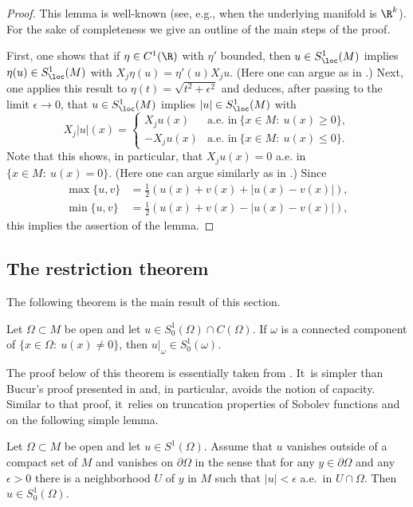 \begin{proof}
This lemma is well-known (see, e.g., \cite[Lem.\,3.5]{GaNh} when the underlying manifold is $\R^k$). For the sake of completeness we give an outline of the main steps of the proof.

First, one shows that if $\eta\in C^1(\R)$ with $\eta'$ bounded, then $u\in S^1_\loc(M)$ implies $\eta(u)\in S^1_\loc(M)$ with $X_j\eta(u) = \eta'(u)X_j u$. (Here one can argue as in \cite[Th.\,1.18]{HeKiMa}.) Next, one applies this result to $\eta(t)=\sqrt{t^2+\epsilon^2}$ and deduces, after passing to the limit $\epsilon\to 0$, that $u\in S^1_\loc(M)$ implies $|u|\in S^1_\loc(M)$ with
\[
X_j|u|(x) =
\begin{cases}
X_j u(x) & \text{a.e.\ in}\ \{ x\in M:\ u(x)\geq 0\},\\
- X_ju(x) & \text{a.e.\ in}\ \{ x\in M:\ u(x)\leq 0 \}.
\end{cases}
\]
Note that this shows, in particular, that $X_j u(x)=0$ a.e. in $\{x\in M:\ u(x)=0\}$. (Here one can argue similarly as in \cite[Lem.\,1.19]{HeKiMa}.) Since
\begin{align*}
\max\{u,v\} & = \tfrac12(u(x)+v(x) + |u(x)-v(x)|), \\
\min\{u,v\} & = \tfrac12(u(x)+v(x) - |u(x)-v(x)|),
\end{align*}
this implies the assertion of the lemma.
\end{proof}

\subsection{The restriction theorem}
The following theorem is the main result of this section.

\begin{theorem}\label{restriction}
Let $\Omega\subset M$ be open and let $u\in S^1_0(\Omega)\cap C(\Omega)$. If $\omega$ is a connected component of $\{ x\in\Omega:\ u(x)\neq 0\}$, then $u|_\omega \in S^1_0(\omega)$.
\end{theorem}

The proof below of this theorem is essentially taken from \cite{MP}. It~is simpler than Bucur's proof presented in \cite{LMP} and, in particular, avoids the notion of capacity. Similar to that proof, it~relies on truncation properties of Sobolev functions and on the following simple lemma.

\begin{lemma}\label{s10easy}
Let $\Omega\subset M$ be open and let $u\in S^1(\Omega)$. Assume that $u$ vanishes outside of a compact set of $M$ and vanishes on $\partial\Omega$ in the sense that for any $y\in\partial\Omega$ and any $\epsilon>0$ there is a neighborhood $U$ of $y$ in $M$ such that $|u|<\epsilon$ a.e.\ in $U\cap\Omega$. Then $u\in S^1_0(\Omega)$.
\end{lemma}

